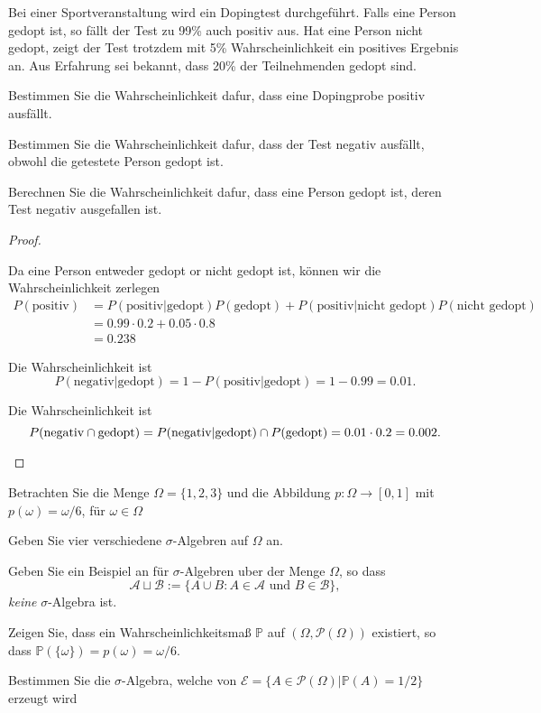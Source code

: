 \begin{Problem}
	Bei einer Sportveranstaltung wird ein Dopingtest durchgeführt. Falls eine Person gedopt ist, so fällt der Test zu 99\% auch positiv aus. Hat eine Person nicht gedopt, zeigt der Test trotzdem mit 5\% Wahrscheinlichkeit ein positives Ergebnis an. Aus Erfahrung sei bekannt, dass 20\% der Teilnehmenden gedopt sind.
	\begin{parts}
		\item Bestimmen Sie die Wahrscheinlichkeit dafur, dass eine Dopingprobe positiv ausf\"{a}llt.
		\item Bestimmen Sie die Wahrscheinlichkeit dafur, dass der Test negativ ausf\"{a}llt, obwohl die getestete Person gedopt ist.
		\item Berechnen Sie die Wahrscheinlichkeit dafur, dass eine Person gedopt ist, deren Test negativ ausgefallen ist.
	\end{parts}
\end{Problem}
\begin{proof}
	\begin{parts}
	\item Da eine Person entweder gedopt or nicht gedopt ist, können wir die Wahrscheinlichkeit zerlegen
		\begin{align*}
			P(\text{positiv})&=P(\text{positiv}|\text{gedopt})P(\text{gedopt}) + P(\text{positiv}|\text{nicht gedopt})P(\text{nicht gedopt})\\
					 &=0.99\cdot 0.2+0.05\cdot 0.8\\
					 &=0.238
		\end{align*}
	\item Die Wahrscheinlichkeit ist
		\[
			P(\text{negativ}|\text{gedopt})=1-P(\text{positiv}|\text{gedopt})=1-0.99=0.01
		.\] 
	\item Die Wahrscheinlichkeit ist
		\[
			P(\text{negativ}\cap \text{gedopt})=P(\text{negativ}|\text{gedopt})\cap P(\text{gedopt})=0.01\cdot 0.2=0.002
		.\qedhere\] 
	\end{parts}
\end{proof}
\begin{Problem}
	Betrachten Sie die Menge $\Omega = \{1, 2, 3\}$ und die Abbildung $p : \Omega \to [0, 1]$ mit $p(\omega) = \omega/6$, f\"{u}r $\omega\in\Omega$
	\begin{parts}
		\item Geben Sie vier verschiedene $\sigma$-Algebren auf $\Omega$ an.
		\item Geben Sie ein Beispiel an f\"{u}r $\sigma$-Algebren uber der Menge $\Omega$, so dass
		\[\mathcal{A}\sqcup \mathcal{B}:=\{A\cup B:A\in\mathcal{A}\text{ und }B\in\mathcal{B}\},\]
		\emph{keine} $\sigma$-Algebra ist.
		\item Zeigen Sie, dass ein Wahrscheinlichkeitsmaß $\mathbb{P}$ auf $(\Omega,\mathcal{P}(\Omega))$ existiert, so dass $\mathbb{P}(\{\omega\}) =p(\omega)=\omega/6$.
		\item Bestimmen Sie die $\sigma$-Algebra, welche von $\mathcal{E} = \{A\in \mathcal{P}(\Omega)|\mathbb{P}(A) = 1/2\}$ erzeugt wird
	\end{parts}
	\end{Problem}
